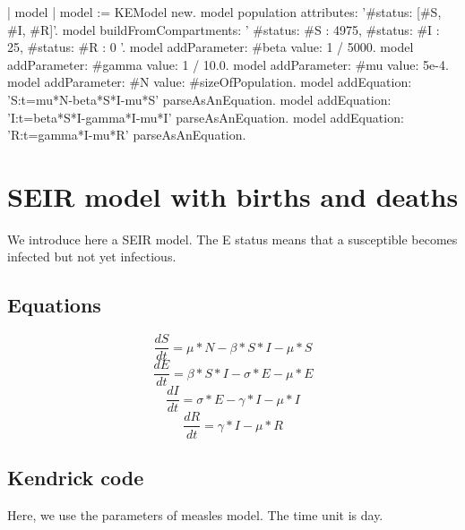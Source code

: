 \documentclass[a4paper,10pt,twoside]{book}
\begin{document}

\begin{code}{}
| model |
	model := KEModel new.
	model population attributes: '{#status: [#S, #I, #R]}'.
  model
		buildFromCompartments:
			'{
		{ #status: #S }: 4975,
		{ #status: #I }: 25,
		{ #status: #R }: 0
	}'.
	model addParameter: #beta value: 1 / 5000.
	model addParameter: #gamma value: 1 / 10.0.
	model addParameter: #mu value: 5e-4.
	model addParameter: #N value: #sizeOfPopulation.
	model addEquation: 'S:t=mu*N-beta*S*I-mu*S' parseAsAnEquation.
	model addEquation: 'I:t=beta*S*I-gamma*I-mu*I' parseAsAnEquation.
	model addEquation: 'R:t=gamma*I-mu*R' parseAsAnEquation.
\end{code}

\section{ SEIR model with births and deaths}
We introduce here a SEIR model. The E status means that a susceptible becomes infected but not yet infectious.
\subsection{Equations}

  \begin{equation}
    \frac{dS}{dt} = \mu*N - \beta*S*I - \mu*S
  \end{equation}
  \begin{equation}
    \frac{dE}{dt} = \beta*S*I - \sigma*E - \mu*E
  \end{equation}
  \begin{equation}
    \frac{dI}{dt} = \sigma*E - \gamma*I - \mu*I
  \end{equation}
  \begin{equation}
    \frac{dR}{dt} = \gamma*I - \mu*R
  \end{equation}
  
\subsection{Kendrick code}
Here, we use the parameters of measles model. The time unit is day.

\end{document}
